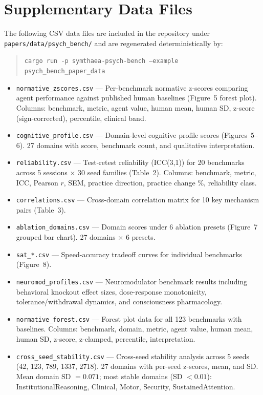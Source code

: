 \documentclass[10pt,landscape]{article}
\begin{document}
\clearpage
\section*{Supplementary Data Files}

The following CSV data files are included in the repository under \texttt{papers/data/psych\_bench/} and are regenerated deterministically by:

\begin{quote}
\texttt{cargo run -p symthaea-psych-bench --example psych\_bench\_paper\_data}
\end{quote}

\begin{itemize}
\item \texttt{normative\_zscores.csv} --- Per-benchmark normative z-scores comparing agent performance against published human baselines (Figure~5 forest plot). Columns: benchmark, metric, agent value, human mean, human SD, z-score (sign-corrected), percentile, clinical band.
\item \texttt{cognitive\_profile.csv} --- Domain-level cognitive profile scores (Figures~5--6). 27 domains with score, benchmark count, and qualitative interpretation.
\item \texttt{reliability.csv} --- Test-retest reliability (ICC(3,1)) for 20 benchmarks across 5 sessions $\times$ 30 seed families (Table~2). Columns: benchmark, metric, ICC, Pearson $r$, SEM, practice direction, practice change \%, reliability class.
\item \texttt{correlations.csv} --- Cross-domain correlation matrix for 10 key mechanism pairs (Table~3).
\item \texttt{ablation\_domains.csv} --- Domain scores under 6 ablation presets (Figure~7 grouped bar chart). 27 domains $\times$ 6 presets.
\item \texttt{sat\_*.csv} --- Speed-accuracy tradeoff curves for individual benchmarks (Figure~8).
\item \texttt{neuromod\_profiles.csv} --- Neuromodulator benchmark results including behavioral knockout effect sizes, dose-response monotonicity, tolerance/withdrawal dynamics, and consciousness pharmacology.
\item \texttt{normative\_forest.csv} --- Forest plot data for all 123 benchmarks with baselines. Columns: benchmark, domain, metric, agent value, human mean, human SD, z-score, z-clamped, percentile, interpretation.
\item \texttt{cross\_seed\_stability.csv} --- Cross-seed stability analysis across 5 seeds (42, 123, 789, 1337, 2718). 27 domains with per-seed z-scores, mean, and SD. Mean domain SD $= 0.071$; most stable domains (SD $< 0.01$): InstitutionalReasoning, Clinical, Motor, Security, SustainedAttention.
\end{itemize}
\end{document}
